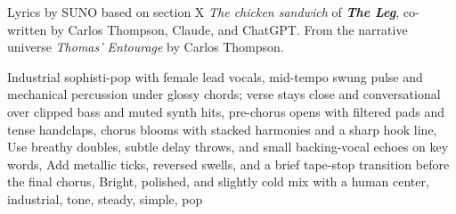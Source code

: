 
\begin{notes}
Lyrics by SUNO based on section X \emph{The chicken sandwich} of \emph{\bfseries The Leg}, %
co-written by Carlos Thompson, Claude, and ChatGPT. %
From the narrative universe \emph{Thomas’ Entourage} by Carlos Thompson.
\end{notes}
\begin{style}
Industrial sophisti-pop with female lead vocals, mid-tempo swung pulse and mechanical percussion under glossy chords; verse stays close and conversational over clipped bass and muted synth hits, pre-chorus opens with filtered pads and tense handclaps, chorus blooms with stacked harmonies and a sharp hook line, Use breathy doubles, subtle delay throws, and small backing-vocal echoes on key words, Add metallic ticks, reversed swells, and a brief tape-stop transition before the final chorus, Bright, polished, and slightly cold mix with a human center, industrial, tone, steady, simple, pop
\end{style}
